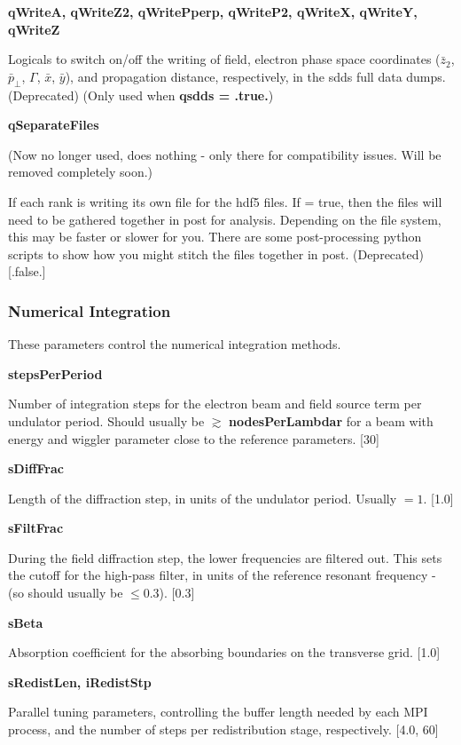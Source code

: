 \documentclass[12pt]{article}%
\begin{document}
{\bf qWriteA, qWriteZ2, qWritePperp, qWriteP2, qWriteX, qWriteY, qWriteZ}

Logicals to switch on/off the writing of field, electron phase space coordinates ($\bar{z}_2$, $\bar{p}_\bot$, $\Gamma$, $\bar{x}$, $\bar{y}$), and propagation distance, respectively, in the sdds full data dumps. (Deprecated) (Only used when {\bf qsdds = .true.})

{\bf qSeparateFiles}

(Now no longer used, does nothing - only there for compatibility issues. Will be removed completely soon.)

If each rank is writing its own file for the hdf5 files. If = true, then the files will need to be gathered together in post for analysis. Depending on the file system, this may be faster or slower for you. There are some post-processing python scripts to show how you might stitch the files together in post. (Deprecated) [.false.]


\subsubsection{Numerical Integration}

These parameters control the numerical integration methods.

{\bf stepsPerPeriod}

Number of integration steps for the electron beam and field source term per undulator period. Should usually be $\gtrsim$ {\bf nodesPerLambdar} for a beam with energy and wiggler parameter close to the reference parameters. [30]

{\bf sDiffFrac}

Length of the diffraction step, in units of the undulator period. Usually $=1$. [1.0]

{\bf sFiltFrac}

During the field diffraction step, the lower frequencies are filtered out. This sets the cutoff for the high-pass filter, in units of the reference resonant frequency - (so should usually be $\leq 0.3$). [0.3]

{\bf sBeta}

Absorption coefficient for the absorbing boundaries on the transverse grid. [1.0]

{\bf sRedistLen, iRedistStp}

Parallel tuning parameters, controlling the buffer length needed by each MPI process, and the number of steps per redistribution stage, respectively. [4.0, 60]
\end{document}
